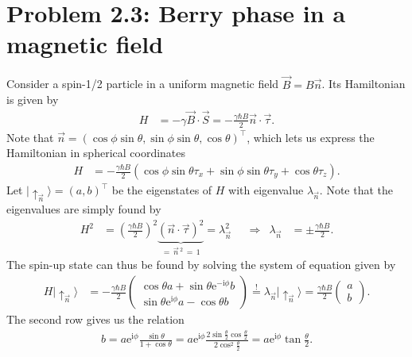 \documentclass[english, parskip=full]{scrartcl}
\newcommand{\kla}{}
\newcommand{\Ket}{}
\renewcommand{\i}{\text{i}}
\newcommand{\e}{\text{e}}
\begin{document}
\section*{Problem 2.3: Berry phase in a magnetic field}
Consider a spin-1/2 particle in a uniform magnetic field $\vec{B} = B\vec{n}$. 
Its Hamiltonian is given by
\begin{align}
H &= -\gamma\vec{B}\cdot \vec{S} = -\frac{\gamma\hbar B}{2}\vec{n}\cdot\vec{\tau}.
\end{align}
Note that $\vec{n}  =(\cos\phi\sin\theta, \sin\phi\sin\theta, \cos\theta)^\top$, which lets us express the Hamiltonian in spherical coordinates
\begin{align}
H &= -\frac{\gamma\hbar B}{2} \kla\left( \cos\phi\sin\theta\tau_x + \sin\phi\sin\theta\tau_y + \cos\theta\tau_z \right).
\end{align}
Let $\Ket | \uparrow_{\vec{n}} \rangle = (a, b)^\top$ be the eigenstates of $H$ with eigenvalue $\lambda_{\vec{n}}$.
Note that the eigenvalues are simply found by
\begin{align}
H^2 &= \kla\left( \frac{\gamma\hbar B}{2} \right)^2 \underbrace{(\vec{n}\cdot\vec{\tau})^2}_{=\,\vec{n}\,^2\,=\, 1} = \lambda_{\vec{n}}^2 &&\Rightarrow & \lambda_{\vec{n}} &= \pm \frac{\gamma\hbar B}{2}.
\end{align}
The spin-up state can thus be found by solving the system of equation given by 
\begin{align}
H\Ket | \uparrow_{\vec{n}} \rangle &=  -\frac{\gamma\hbar B}{2} \begin{pmatrix}
\cos\theta a + \sin\theta \e^{-\i\phi}b \\
\sin\theta\e^{\i\phi} a - \cos\theta b
\end{pmatrix} \overset{!}{=} \lambda_{\vec{n}}\Ket | \uparrow_{\vec{n}} \rangle = \frac{\gamma\hbar B}{2}\begin{pmatrix}
a \\ b
\end{pmatrix}.
\end{align}
The second row gives us the relation 
\begin{align}
b =  a \e^{\i\phi} \frac{\sin\theta}{1 + \cos\theta}  =  a \e^{\i\phi}  \frac{2\sin\frac{\theta}{2}\cos\frac{\theta}{2}}{ 2\cos^2\frac{\theta}{2}} =  a \e^{\i\phi} \tan\frac{\theta}{2}.
\end{align}
\end{document}
